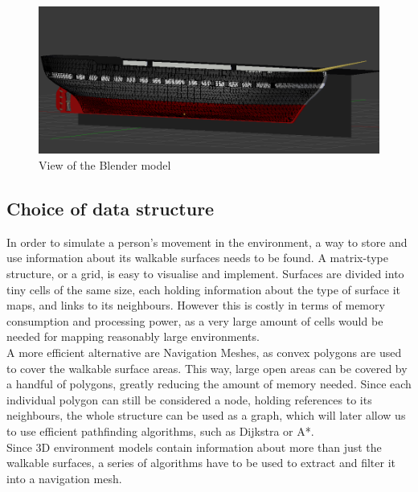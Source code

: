 \begin{figure}[H]
	\centering
	\includegraphics[width=1\textwidth]{../images/wireframe.png}
	\caption{View of the Blender model}
\end{figure}

\subsection {Choice of data structure}
In order to simulate a person's movement in the environment, a way to store and use information about its walkable surfaces needs to be found.
A matrix-type structure, or a grid, is easy to visualise and implement. Surfaces are divided into tiny cells of the same size, each holding information about the type of surface it maps, and links to its neighbours. However this is costly in terms of memory consumption and processing power, as a very large amount of cells would be needed for mapping reasonably large environments.\\
A more efficient alternative are Navigation Meshes, as convex polygons are used to cover the walkable surface areas. This way, large open areas can be covered by a handful of polygons, greatly reducing the amount of memory needed. Since each individual polygon can still be considered a node, holding references to its neighbours, the whole structure can be used as a graph, which will later allow us to use efficient pathfinding algorithms, such as Dijkstra or A*.\\
Since 3D environment models contain information about more than just the walkable surfaces, a series of algorithms have to be used to extract and filter it into a navigation mesh.


